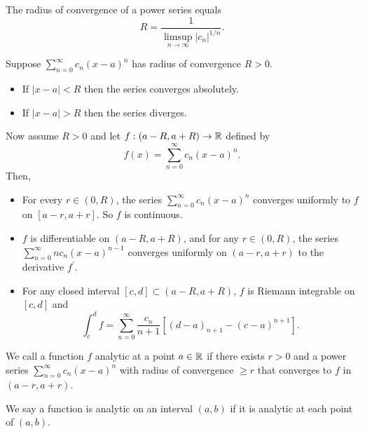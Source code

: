 \documentclass[twoside]{article}
\begin{document}
\begin{definition}
    The radius of convergence of a power series equals
    \begin{equation*}
        R = \frac{1}{\limsup_{n\to \infty}|c_{n}|^{1/n}}.
    \end{equation*}
\end{definition}

\begin{definition}
    Suppose $\sum_{n = 0}^{\infty}c_{n}(x - a)^{n}$ has radius of convergence $R > 0$.
    \begin{itemize}
        \item If $|x - a| < R$ then the series converges absolutely.
        \item If $|x - a| > R$ then the series diverges.
    \end{itemize}
    Now assume $R > 0$ and let $f: (a - R, a + R) \to \mathbb{R}$ defined by
    \begin{equation*}
        f(x) = \sum_{n=0}^{\infty}c_{n}(x - a)^{n}.
    \end{equation*}
    Then,
    \begin{itemize}
        \item For every $r \in (0, R)$, the series $\sum_{n = 0}^{\infty} c_{n}(x - a)^{n}$
            converges uniformly to $f$ on $[a - r, a + r]$. So $f$ is continuous.
        \item $f$ is differentiable on $(a - R, a + R)$, and for any $r \in (0, R)$,
            the series $\sum_{n = 0}^{\infty} nc_{n}(x - a)^{n - 1}$ converges
            uniformly on $(a - r, a + r)$ to the derivative $f^{\prime}$.
        \item For any closed interval $[c, d] \subset (a - R, a + R)$, $f$ is
            Riemann integrable on $[c, d]$ and 
            \begin{equation*}
                \int_{c}^{d} f = \sum_{n = 0}^{\infty}\frac{c_{n}}{n + 1} [(d - a)_{n + 1} - (c - a)^{n + 1}].
            \end{equation*}
    \end{itemize}
\end{definition}

\begin{definition}
    We call a function $f$ analytic at a point $a \in \mathbb{R}$ if there exists $r > 0$
    and a power series $\sum_{n = 0}^{\infty} c_{n}(x - a)^{n}$ with radius
    of convergence $\geq r$ that converges to $f$ in $(a - r, a + r)$.

    We say a function is analytic on an interval $(a, b)$ if it is analytic 
    at each point of $(a, b)$.
\end{definition}
\end{document}
